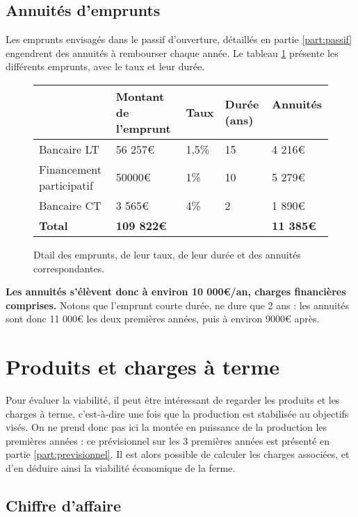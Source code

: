 \documentclass{book}
\begin{document}
\subsection{Annuités d'emprunts}

Les emprunts envisagés dans le passif d'ouverture, détaillés en partie \ref{part:passif} engendrent des annuités à rembourser chaque année. Le tableau \ref{tab:annuites} présente les différents emprunts, avec le taux et leur durée.

\begin{figure}[h!]
\footnotesize
\center
\begin{tabular}{ | p{} | p{3cm}| p{1cm}| p{}|p{2cm}| }
\hline
	& Montant de l'emprunt & Taux & Durée (ans) & Annuités \  \\ \hline
	Bancaire LT & 56 257\euro{} & 1,5\% & 15 & 4 216\euro{} \\ \hline
	Financement participatif & 50000\euro{} & 1\% & 10 & 5 279\euro{} \\ \hline
	Bancaire CT & 3 565\euro{} & 4\% & 2 & 1 890\euro{} \\ \hline
	\textbf{Total} & \textbf{109 822\euro{}} &  & & \textbf{11 385\euro{}}  \\ \hline
\end{tabular}
\caption{Dtail des emprunts, de leur taux, de leur durée et des annuités correspondantes.}
\label{tab:annuites}
\end{figure}

\textbf{Les annuités s'élèvent donc à environ 10 000\euro{}/an, charges financières comprises.} Notons que l'emprunt courte durée, ne dure que 2 ans : les annuités sont donc 11 000\euro{} les deux premières années, puis à environ 9000\euro{} après. 

\section{Produits et charges à terme}

Pour évaluer la viabilité, il peut être intéressant de regarder les produits et les charges à terme, c'est-à-dire une fois que la production est stabilisée au objectifs visés. On ne prend donc pas ici la montée en puissance de la production les premières années : ce prévisionnel sur les 3 premières années est présenté en partie \ref{part:previsionnel}. Il est alors possible de calculer les charges associées, et d'en déduire ainsi la viabilité économique de la ferme.

\subsection{Chiffre d'affaire}
\end{document}

